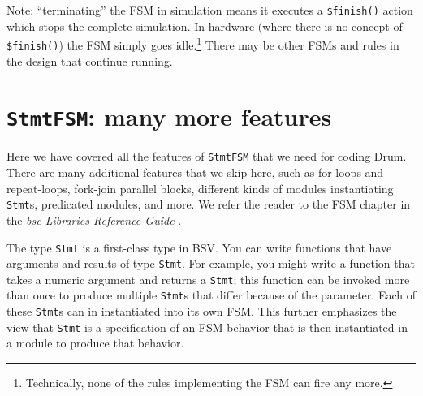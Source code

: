 Note: ``terminating'' the FSM in simulation means it executes a
\verb|$finish()| action which stops the complete simulation.  In
hardware (where there is no concept of \verb|$finish()|) the FSM
simply goes idle.\footnote{Technically, none of the rules implementing
the FSM can fire any more.}  There may be other FSMs and rules in the
design that continue running.


\section{{\tt StmtFSM}: many more features}


Here we have covered all the features of \verb|StmtFSM| that we need
for coding Drum.  There are many additional features that we skip
here, such as for-loops and repeat-loops, fork-join parallel blocks,
different kinds of modules instantiating \verb|Stmt|s, predicated
modules, and more.  We refer the reader to the FSM chapter in the
\emph{bsc Libraries Reference Guide} \cite{bsc_libs_ref_guide}.

The type \verb|Stmt| is a first-class type in BSV.  You can write
functions that have arguments and results of type \verb|Stmt|.  For
example, you might write a function that takes a numeric argument and
returns a \verb|Stmt|; this function can be invoked more than once to
produce multiple \verb|Stmt|s that differ because of the parameter.
Each of these \verb|Stmt|s can in instantiated into its own FSM.  This
further emphasizes the view that \verb|Stmt| is a specification of an
FSM behavior that is then instantiated in a module to produce that
behavior.

